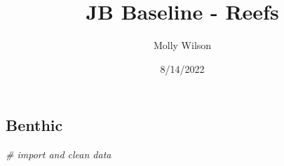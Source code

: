 \documentclass[
]{article}
\title{JB Baseline - Reefs}
\author{Molly Wilson}
\date{8/14/2022}
\newenvironment{Shaded}{\begin{snugshade}}{\end{snugshade}}
\newcommand{\CommentTok}[1]{\textcolor[rgb]{0.56,0.35,0.01}{\textit{#1}}}
\begin{document}
\maketitle

\hypertarget{section}{%
\section{}\label{section}}

\hypertarget{benthic}{%
\subsection{Benthic}\label{benthic}}

\begin{Shaded}
\begin{Highlighting}[]
\CommentTok{\# import and clean data}


\end{Highlighting}
\end{Shaded}
\end{document}
